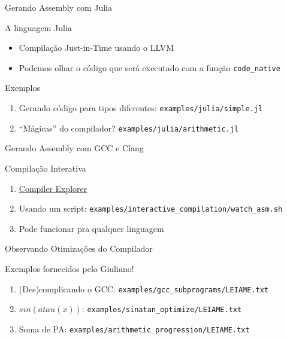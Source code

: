 \documentclass[10pt, compress, aspectratio=169, xcolor={table,usenames,dvipsnames}]{beamer}
\begin{document}
\begin{frame}[label={sec:org23951a7},fragile]{Gerando Assembly com Julia}
 \begin{block}{A linguagem Julia}
\begin{itemize}
\item Compilação \alert{Just-in-Time} usando o LLVM
\item Podemos olhar o código que será executado com a função \texttt{code\_native}
\end{itemize}
\end{block}
\begin{block}{Exemplos}
\begin{enumerate}
\item Gerando código para \alert{tipos diferentes}: \texttt{examples/julia/simple.jl}
\item \alert{``Mágicas''} do compilador? \texttt{examples/julia/arithmetic.jl}
\end{enumerate}
\end{block}
\end{frame}
\begin{frame}[label={sec:org5752255},fragile]{Gerando Assembly com GCC e Clang}
 \begin{block}{Compilação Interativa}
\begin{enumerate}
\item \href{https://godbolt.org/}{Compiler Explorer}
\item Usando um script: \texttt{examples/interactive\_compilation/watch\_asm.sh}
\item Pode funcionar pra qualquer linguagem
\end{enumerate}
\end{block}
\end{frame}
\begin{frame}[label={sec:orga68d387},fragile]{Observando Otimizações do Compilador}
 \begin{block}{Exemplos fornecidos pelo \alert{Giuliano}!}
\begin{enumerate}
\item (Des)complicando o GCC: \texttt{examples/gcc\_subprograms/LEIAME.txt}
\item \(sin(atan(x))\): \texttt{examples/sinatan\_optimize/LEIAME.txt}
\item Soma de PA: \texttt{examples/arithmetic\_progression/LEIAME.txt}
\end{enumerate}
\end{block}
\end{frame}
\maketitle
\end{document}
